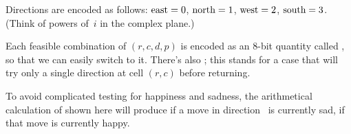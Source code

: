 Directions are encoded as follows: $\rm east=0$, $\rm north=1$,
$\rm west=2$, $\rm south=3$. (Think of powers of~$i$ in the complex
plane.)

Each feasible combination of $(r,c,d,p)$ is encoded as an 8-bit quantity
called , so that we can easily switch to it.
There's also ; this stands for a case that will
try
only a single direction  at cell $(r,c)$ before returning.

To avoid complicated testing for happiness and sadness, the arithmetical
calculation of  shown here will produce  if a move in
direction~ is currently sad,  if that move is currently
happy.

